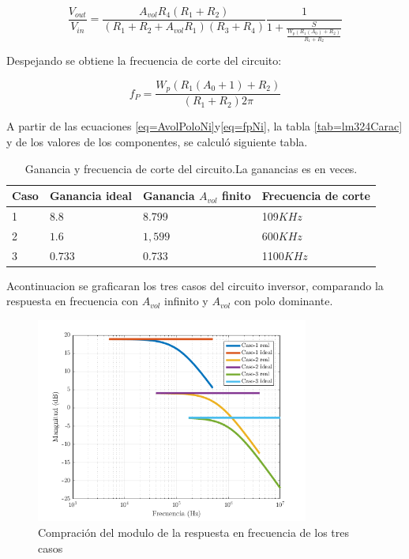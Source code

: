 \documentclass[../../main.tex]{subfiles}
\begin{document}
\begin{equation}
 \frac{V_{out}}{V_{in}}=\frac{A_{vol}R_{4}(R_{1}+R_{2})}{(R_{1}+R_{2}+A_{vol}	R_{1})(R_{3}+R_{4})}  \frac{1}{1 + \frac{S}{\frac{W_{p}(R_{1}(A_{0})+R_{2})}{R_{1}+R_{2}}}}\label{eq=AvolPoloNi}
\end{equation}

Despejando se obtiene la frecuencia de corte del circuito:

\begin{equation}
f_{P}=\frac{W_{p}(R_{1}(A_{0}+1)+R_{2})}{(R_{1}+R_{2})2 \pi } \label{eq=fpNi}
\end{equation}

A partir de las ecuaciones \ref{eq=AvolPoloNi}y\ref{eq=fpNi}, la tabla \ref{tab=lm324Carac} y de los valores de los componentes, se calculó siguiente tabla.

\begin{table}[h]
\begin{center}
\begin{tabular}{|l|l|l|l|}
\hline
Caso &Ganancia ideal & Ganancia $A_{vol}$ finito & Frecuencia de corte\\
\hline \hline
1 & $8.8$ & 8.799 & 109$KHz$ \\ \hline
2 & $1.6$ &  $1,599 $ &  600$KHz$  \\ \hline
3 & $0.733$ &0.733 &1100$KHz$\\ \hline
\end{tabular}
\caption{Ganancia y frecuencia de corte del circuito.La ganancias es en veces.} 
\label{tab=gananciayFrecCorteNi}
\end{center}
\end{table}
Acontinuacion se graficaran los tres casos del circuito inversor, comparando la respuesta en frecuencia con  $A_{vol}$ infinito y $A_{vol}$ con polo dominante.

\begin{figure}[H]
\centering
\includegraphics[width=0.8\textwidth]{imagenes/real_ideal_mag_n.png}
\caption{Compración del modulo de la respuesta en frecuencia de los tres casos}
\end{figure}
\end{document}
